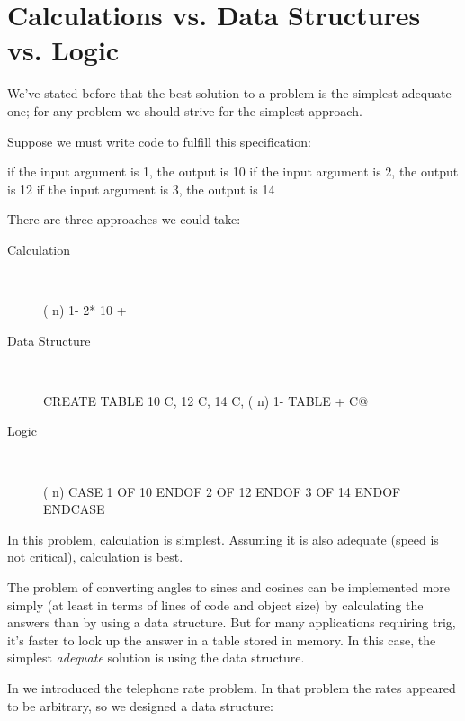 \section{Calculations vs. Data Structures vs. Logic}%
%
%
%
%
%

We've stated before that the best solution to a problem is the simplest
adequate one; for any problem we should strive for the simplest
approach.

Suppose we must write code to fulfill this specification:

\begin{Code}[fontfamily=cmss]
if the input argument is 1, the output is 10
if the input argument is 2, the output is 12
if the input argument is 3, the output is 14
\end{Code}
There are three approaches we could take:

\begin{description}
\item[Calculation]~
\begin{Code}
( n)  1-  2*  10 +
\end{Code}
\medbreak
\item[Data Structure]~
\begin{Code}
CREATE TABLE  10 C,  12 C,  14 C,
( n)  1- TABLE + C@
\end{Code}
\medbreak
\item[Logic]~
\begin{Code}
( n)  CASE
         1 OF 10 ENDOF
         2 OF 12 ENDOF
         3 OF 14 ENDOF  ENDCASE
\end{Code}
\end{description}
In this problem, calculation is simplest. Assuming it is also adequate
(speed is not critical), calculation is best.

The problem of converting angles to sines and cosines can be implemented
more simply (at least in terms of lines of code and object size)
by calculating the answers than by using a data structure. But for many
applications requiring trig, it's faster to look up the answer in a table
stored in memory. In this case, the simplest \emph{adequate} solution is
using the data structure.

In  we introduced the telephone rate problem. In that
problem the rates appeared to be arbitrary, so we designed a data
structure:

